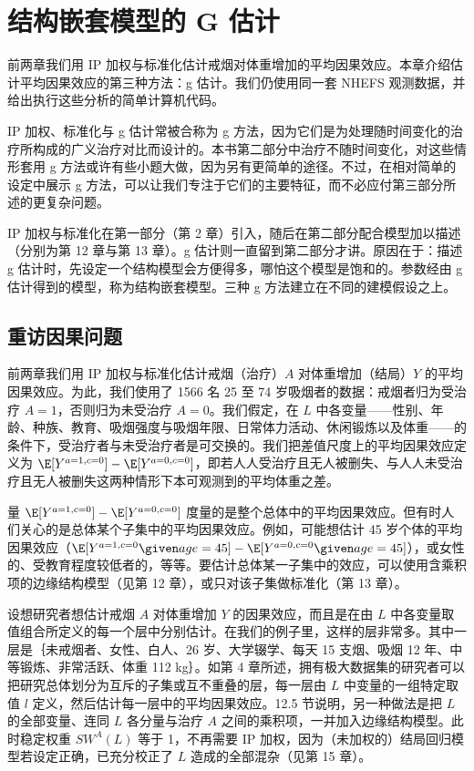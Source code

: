 \chapter[\hspace{0.6em}结构嵌套模型的 G 估计]{结构嵌套模型的 G 估计}

前两章我们用 IP 加权与标准化估计戒烟对体重增加的平均因果效应。本章介绍估计平均因果效应的第三种方法：g 估计。我们仍使用同一套 NHEFS 观测数据，并给出执行这些分析的简单计算机代码。

IP 加权、标准化与 g 估计常被合称为 g 方法，因为它们是为处理随时间变化的治疗所构成的广义治疗对比而设计的。本书第二部分中治疗不随时间变化，对这些情形套用 g 方法或许有些小题大做，因为另有更简单的途径。不过，在相对简单的设定中展示 g 方法，可以让我们专注于它们的主要特征，而不必应付第三部分所述的更复杂问题。

IP 加权与标准化在第一部分（第 2 章）引入，随后在第二部分配合模型加以描述（分别为第 12 章与第 13 章）。g 估计则一直留到第二部分才讲。原因在于：描述 g 估计时，先设定一个结构模型会方便得多，哪怕这个模型是饱和的。参数经由 g 估计得到的模型，称为结构嵌套模型。三种 g 方法建立在不同的建模假设之上。

\section{重访因果问题}

前两章我们用 IP 加权与标准化估计戒烟（治疗）$A$ 对体重增加（结局）$Y$ 的平均因果效应。为此，我们使用了 1566 名 25 至 74 岁吸烟者的数据：戒烟者归为受治疗 $A=1$，否则归为未受治疗 $A=0$。我们假定，在 $L$ 中各变量——性别、年龄、种族、教育、吸烟强度与吸烟年限、日常体力活动、休闲锻炼以及体重——的条件下，受治疗者与未受治疗者是可交换的。我们把差值尺度上的平均因果效应定义为 $\E[Y^{a=1,c=0}]-\E[Y^{a=0,c=0}]$，即若人人受治疗且无人被删失、与人人未受治疗且无人被删失这两种情形下本可观测到的平均体重之差。


量 $\E[Y^{a=1,c=0}]-\E[Y^{a=0,c=0}]$ 度量的是整个总体中的平均因果效应。但有时人们关心的是总体某个子集中的平均因果效应。例如，可能想估计 45 岁个体的平均因果效应（$\E[Y^{a=1,c=0}\given age=45]-\E[Y^{a=0,c=0}\given age=45]$），或女性的、受教育程度较低者的，等等。要估计总体某一子集中的效应，可以使用含乘积项的边缘结构模型（见第 12 章），或只对该子集做标准化（第 13 章）。

设想研究者想估计戒烟 $A$ 对体重增加 $Y$ 的因果效应，而且是在由 $L$ 中各变量取值组合所定义的每一个层中分别估计。在我们的例子里，这样的层非常多。其中一层是｛未戒烟者、女性、白人、26 岁、大学辍学、每天 15 支烟、吸烟 12 年、中等锻炼、非常活跃、体重 112 kg｝。如第 4 章所述，拥有极大数据集的研究者可以把研究总体划分为互斥的子集或互不重叠的层，每一层由 $L$ 中变量的一组特定取值 $l$ 定义，然后估计每一层中的平均因果效应。12.5 节说明，另一种做法是把 $L$ 的全部变量、连同 $L$ 各分量与治疗 $A$ 之间的乘积项，一并加入边缘结构模型。此时稳定权重 $SW^A(L)$ 等于 1，不再需要 IP 加权，因为（未加权的）结局回归模型若设定正确，已充分校正了 $L$ 造成的全部混杂（见第 15 章）。

